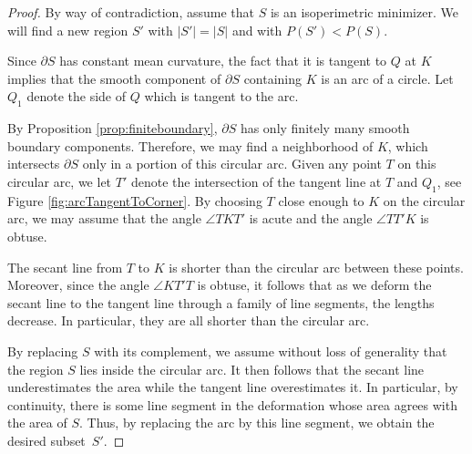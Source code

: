 \documentclass[leqno]{article}
\numberwithin{equation}{section}
\theoremstyle{definition}
\theoremstyle{remark}
\theoremstyle{plain}
\begin{document}
\begin{proof} By way of contradiction, assume that $S$ is an isoperimetric minimizer. We will find a new region $S'$ with $|S'| = |S|$ and with $P(S') < P(S)$.

Since $\partial S$ has constant mean curvature, the fact that it is tangent to $Q$ at $K$ implies that the smooth component of $\partial S$ containing $K$ is an arc of a circle.   Let $Q_1$ denote the side of $Q$ which is tangent to the arc.

\begin{center}
    \label{fig:arcTangentToCorner}
\end{center}

By Proposition \ref{prop:finiteboundary}, $\partial S$ has only finitely many smooth boundary components. Therefore, we may find a neighborhood of $K$, which intersects $\partial S$ only in a portion of this circular arc.  Given any point $T$ on this circular arc, we let $T'$ denote the intersection of the tangent line at $T$ and $Q_1$, see Figure \ref{fig:arcTangentToCorner}.  By choosing $T$ close enough to $K$ on the circular arc, we may assume that the angle $\angle TKT'$ is acute and the angle $
\angle TT'K$ is obtuse.

The secant line from $T$ to $K$ is shorter than the circular arc between these points.  Moreover, since the angle $\angle KT'T$ is obtuse, it follows that as we deform the secant line to the tangent line through a family of line segments, the lengths decrease.  In particular, they are all shorter than the circular arc.

By replacing $S$ with its complement, we assume without loss of generality that the region $S$ lies inside the circular arc.   It then follows that the secant line underestimates the area while the tangent line overestimates it.  In particular, by continuity, there is some line segment in the deformation whose area agrees with the area of $S$.  Thus, by replacing the arc by this line segment, we obtain the desired subset~$S'$.

\end{proof}
\end{document}
